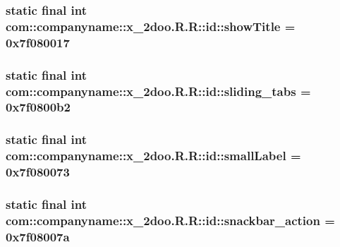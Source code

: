 \hypertarget{classcom_1_1companyname_1_1x__2doo_1_1_r_1_1id_e9b2a0976dca93db6389a6749987ceb4}{
\subsubsection[{showTitle}]{\setlength{\rightskip}{0pt plus 5cm}static final int com::companyname::x\_\-2doo.R.R::id::showTitle = 0x7f080017}}
\label{classcom_1_1companyname_1_1x__2doo_1_1_r_1_1id_e9b2a0976dca93db6389a6749987ceb4}


\hypertarget{classcom_1_1companyname_1_1x__2doo_1_1_r_1_1id_c76b113d560c47ca272799c0fff77c27}{
\subsubsection[{sliding\_\-tabs}]{\setlength{\rightskip}{0pt plus 5cm}static final int com::companyname::x\_\-2doo.R.R::id::sliding\_\-tabs = 0x7f0800b2}}
\label{classcom_1_1companyname_1_1x__2doo_1_1_r_1_1id_c76b113d560c47ca272799c0fff77c27}


\hypertarget{classcom_1_1companyname_1_1x__2doo_1_1_r_1_1id_75064de2cb206d52896a34cc36f05ec9}{
\subsubsection[{smallLabel}]{\setlength{\rightskip}{0pt plus 5cm}static final int com::companyname::x\_\-2doo.R.R::id::smallLabel = 0x7f080073}}
\label{classcom_1_1companyname_1_1x__2doo_1_1_r_1_1id_75064de2cb206d52896a34cc36f05ec9}


\hypertarget{classcom_1_1companyname_1_1x__2doo_1_1_r_1_1id_6f947b834aad4eb11007f5b08b9f005a}{
\subsubsection[{snackbar\_\-action}]{\setlength{\rightskip}{0pt plus 5cm}static final int com::companyname::x\_\-2doo.R.R::id::snackbar\_\-action = 0x7f08007a}}
\label{classcom_1_1companyname_1_1x__2doo_1_1_r_1_1id_6f947b834aad4eb11007f5b08b9f005a}


